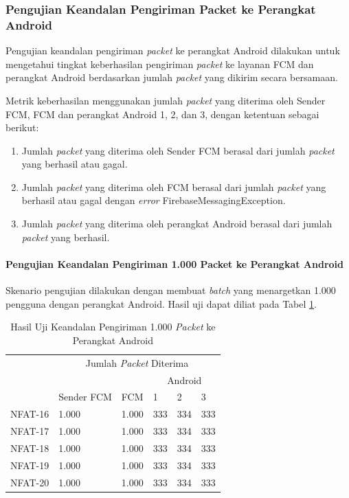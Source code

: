 \subsubsection{Pengujian Keandalan Pengiriman Packet ke Perangkat Android}
\par Pengujian keandalan pengiriman \textit{packet} ke perangkat Android dilakukan untuk mengetahui tingkat keberhasilan pengiriman \textit{packet} ke layanan FCM dan perangkat Android berdasarkan jumlah \textit{packet} yang dikirim secara bersamaan.
\par Metrik keberhasilan menggunakan jumlah \textit{packet} yang diterima oleh Sender FCM, FCM dan perangkat Android 1, 2, dan 3, dengan ketentuan sebagai berikut:
\begin{enumerate}
	\item Jumlah \textit{packet} yang diterima oleh Sender FCM berasal dari jumlah \textit{packet} yang berhasil atau gagal.
	\item Jumlah \textit{packet} yang diterima oleh FCM berasal dari jumlah \textit{packet} yang berhasil atau gagal dengan \textit{error} FirebaseMessagingException.
	\item Jumlah \textit{packet} yang diterima oleh perangkat Android berasal dari jumlah \textit{packet} yang berhasil.
\end{enumerate}


\paragraph{Pengujian Keandalan Pengiriman 1.000 Packet ke Perangkat Android}
\par Skenario pengujian dilakukan dengan membuat \textit{batch} yang menargetkan 1.000 pengguna dengan perangkat Android. Hasil uji dapat diliat pada Tabel \ref{t:keandalan-android-1k}.
\begin{longtable}{|p{1.5cm}|p{2cm}|p{1.5cm}|p{1cm}|p{1cm}|p{1cm}|}
	\caption{Hasil Uji Keandalan Pengiriman 1.000 \textit{Packet} ke Perangkat Android} \label{t:keandalan-android-1k} \\ \hline
	\rowcolor{lightgray} & \multicolumn{5}{c|}{Jumlah \textit{Packet} Diterima} \\ \hhline{~|*5{-}|}
	\rowcolor{lightgray} & & & \multicolumn{3}{c|}{Android} \\ \hhline{~~~|*3{-}|}
	\rowcolor{lightgray} \multirow{-3}{*}{Kode} & \multirow{-2}{*}{Sender FCM} & \multirow{-2}{*}{FCM} & 1 & 2 & 3 \\ \hline
	NFAT-16 & 1.000 & 1.000 & 333 & 334 & 333 \\ \hline
	NFAT-17 & 1.000 & 1.000 & 333 & 334 & 333 \\ \hline
	NFAT-18 & 1.000 & 1.000 & 333 & 334 & 333 \\ \hline
	NFAT-19 & 1.000 & 1.000 & 333 & 334 & 333 \\ \hline
	NFAT-20 & 1.000 & 1.000 & 333 & 334 & 333 \\ \hline
\end{longtable}

